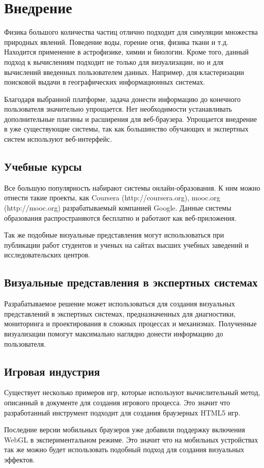 \newpage

\section{Внедрение} %

Физика большого количества частиц отлично подходит для симуляции множества
природных явлений. Поведение воды, горение огня, физика ткани и т.д.
Находится применение в астрофизике, химии и биологии. Кроме того,
данный подход к вычислениям подходит не только для визуализации, но 
и для вычислений введенных пользователем данных. Например, для кластеризации 
поисковой выдачи в географических информационных системах.

Благодаря выбранной платформе, задача донести информацию до конечного пользователя
значительно упрощается. Нет необходимости устанавливать дополнительные плагины
и расширения для веб-браузера. Упрощается внедрение в уже существующие системы, 
так как большинство обучающих и экспертных систем используют веб-интерфейс.

\subsection{Учебные курсы}

Все большую популярность набирают системы онлайн-образования. К ним можно
отнести такие проекты, как Coursera (http://coursera.org), mooc.org (http://mooc.org)
разрабатываемый компанией Google. Данные системы образования распространяются бесплатно 
и работают как веб-приложения.

Так же подобные визуальные представления могут использоваться при публикации работ студентов 
и ученых на сайтах высших учебных заведений и исследовательских центров.

\subsection{Визуальные представления в экспертных системах}

Разрабатываемое решение может использоваться для создания визуальных представлений
в экспертных системах, предназначенных для диагностики, мониторинга и проектирования
в сложных процессах и механизмах. Полученные визуализации помогут максимально наглядно
донести информацию до пользователя.

\subsection{Игровая индустрия}

Существует несколько примеров игр, которые используют вычислительный метод, описанный 
в документе для создания игрового процесса. Это значит что разработанный инструмент
подходит для создания браузерных HTML5 игр.

Последние версии мобильных браузеров уже добавили поддержку включения WebGL в
экспериментальном режиме. Это значит что на мобильных устройствах так же можно будет
использовать подобный подход для создания визуальных эффектов.
